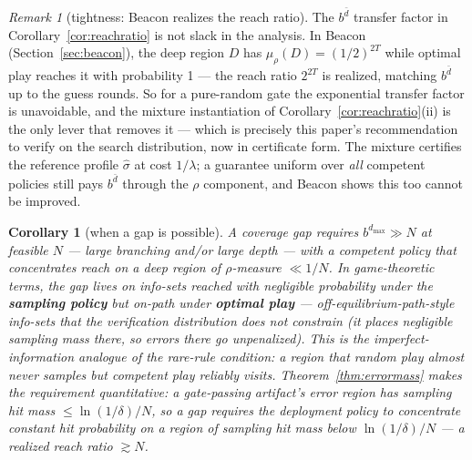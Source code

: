 \documentclass[11pt]{article}
\newtheorem{corollary}{Corollary}
\theoremstyle{remark}
\newtheorem{remark}{Remark}
\newcommand{\dmax}{d_{\max}}
\begin{document}
\begin{remark}[tightness: Beacon realizes the reach ratio]
The $b^{\bar d}$ transfer factor in Corollary~\ref{cor:reachratio} is not slack in the analysis. In Beacon (Section~\ref{sec:beacon}), the deep region $D$ has $\mu_\rho(D) = (1/2)^{2T}$ while optimal play reaches it with probability 1 --- the reach ratio $2^{2T}$ is realized, matching $b^{\bar d}$ up to the guess rounds. So for a pure-random gate the exponential transfer factor is unavoidable, and the mixture instantiation of Corollary~\ref{cor:reachratio}(ii) is the only lever that removes it --- which is precisely this paper's recommendation to verify on the search distribution, now in certificate form. The mixture certifies the reference profile $\hat\sigma$ at cost $1/\lambda$; a guarantee uniform over \emph{all} competent policies still pays $b^{\bar d}$ through the $\rho$ component, and Beacon shows this too cannot be improved.
\end{remark}

\begin{corollary}[when a gap is possible]
A coverage gap requires $b^{\dmax} \gg N$ at feasible $N$ --- large branching and/or large depth --- with a competent policy that concentrates reach on a deep region of $\rho$-measure $\ll 1/N$. In game-theoretic terms, the gap lives on info-sets reached with negligible probability under the \textbf{sampling policy} but on-path under \textbf{optimal play} --- off-equilibrium-path-style info-sets that the verification distribution does not constrain (it places negligible sampling mass there, so errors there go unpenalized). This is the imperfect-information analogue of the rare-rule condition: a region that random play almost never samples but competent play reliably visits. Theorem~\ref{thm:errormass} makes the requirement quantitative: a gate-passing artifact's error region has sampling hit mass $\leq \ln(1/\delta)/N$, so a gap requires the deployment policy to concentrate constant hit probability on a region of sampling hit mass below $\ln(1/\delta)/N$ --- a realized reach ratio $\gtrsim N$.
\end{corollary}
\end{document}

